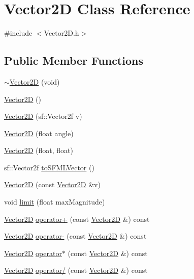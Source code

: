 \hypertarget{class_vector2_d}{}\section{Vector2D Class Reference}
\label{class_vector2_d}


{\ttfamily \#include $<$Vector2\+D.\+h$>$}

\subsection*{Public Member Functions}
\begin{DoxyCompactItemize}
\item 
\hyperlink{class_vector2_d_a519c8120da5581b006fba4d01b243bc1}{$\sim$\+Vector2D} (void)
\item 
\hyperlink{class_vector2_d_a98e9997ebb7a629f4db52397d4e0d653}{Vector2D} ()
\item 
\hyperlink{class_vector2_d_a98cb7602bcb90bbb11b6bb99b3647f1a}{Vector2D} (sf\+::\+Vector2f v)
\item 
\hyperlink{class_vector2_d_ac8545dc4359145ab643ccc88758c9162}{Vector2D} (float angle)
\item 
\hyperlink{class_vector2_d_aadcb679a8c3fd6eaad3418d9df5f7529}{Vector2D} (float, float)
\item 
sf\+::\+Vector2f \hyperlink{class_vector2_d_ad586df868be4520798c5783e317adbeb}{to\+S\+F\+M\+L\+Vector} ()
\item 
\hyperlink{class_vector2_d_a68c8555c932b512c1b371e76c5ee9698}{Vector2D} (const \hyperlink{class_vector2_d}{Vector2D} \&v)
\item 
void \hyperlink{class_vector2_d_afa1ae9e0f8f050504007fe93c72c9ae7}{limit} (float max\+Magnitude)
\item 
\hyperlink{class_vector2_d}{Vector2D} \hyperlink{class_vector2_d_a7d3aaf8b43dab548e9fc8ae62101bacf}{operator+} (const \hyperlink{class_vector2_d}{Vector2D} \&) const
\item 
\hyperlink{class_vector2_d}{Vector2D} \hyperlink{class_vector2_d_ac5aba3d5d2a7bd57ef847e153fad739e}{operator-\/} (const \hyperlink{class_vector2_d}{Vector2D} \&) const
\item 
\hyperlink{class_vector2_d}{Vector2D} \hyperlink{class_vector2_d_a120fd7fe91b4399bd3034196b3ecb66d}{operator$\ast$} (const \hyperlink{class_vector2_d}{Vector2D} \&) const
\item 
\hyperlink{class_vector2_d}{Vector2D} \hyperlink{class_vector2_d_aa8f1dbcedc16fa35320e9a5bf50e78b1}{operator/} (const \hyperlink{class_vector2_d}{Vector2D} \&) const

\end{DoxyCompactItemize}
